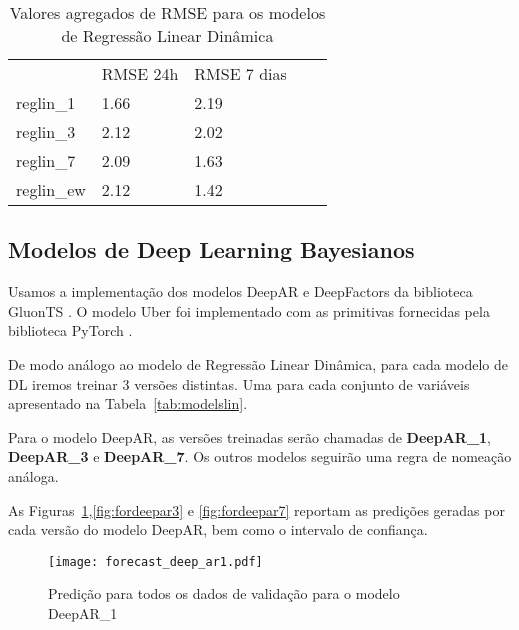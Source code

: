 \begin{center}
  \begin{table}[]
    \centering
    \begin{tabular}{l|llll}
      \cline{2-3}
      & \multicolumn{1}{l|}{RMSE 24h} & \multicolumn{1}{l|}{RMSE 7 dias} &  \\ \cline{1-3}
      \multicolumn{1}{|l|}{reglin\_1} & 1.66                          & 2.19                             &  \\ \cline{1-1}
      \multicolumn{1}{|l|}{reglin\_3} & 2.12                          & 2.02                             &  \\ \cline{1-1}
      \multicolumn{1}{|l|}{reglin\_7} & 2.09                          & 1.63                             &  \\ \cline{1-1}
      \multicolumn{1}{|l|}{reglin\_ew} & 2.12                          & 1.42                            &  \\ \cline{1-1}
    \end{tabular}
    \caption{Valores agregados de RMSE para os modelos de Regressão Linear Dinâmica}

    \label{tb:rmse_exp}
  \end{table}
\end{center}



\subsection{Modelos de Deep Learning Bayesianos}


Usamos a implementação dos modelos DeepAR e DeepFactors da biblioteca GluonTS
\citep{gluonts}. O modelo Uber foi implementado com as primitivas fornecidas
pela biblioteca PyTorch \citep{pytorch}.

De modo análogo ao modelo de Regressão Linear Dinâmica, para
cada modelo de DL iremos treinar 3 versões distintas. Uma para cada conjunto de variáveis apresentado na Tabela~\ref{tab:modelslin}.


Para o modelo DeepAR, as versões treinadas serão chamadas de \textbf{DeepAR\_1},
\textbf{DeepAR\_3} e \textbf{DeepAR\_7}. Os outros modelos seguirão uma
regra de nomeação análoga.

As Figuras~\ref{fig:fordeepar1},\ref{fig:fordeepar3} e \ref{fig:fordeepar7} reportam as
predições geradas por cada versão do modelo DeepAR, bem como o intervalo de confiança. 

\begin{figure}[H]
  \centering
  \texttt{[image: forecast\_deep\_ar1.pdf]} 
  \caption{Predição para todos os dados de validação para o modelo DeepAR\_1}
  \label{fig:fordeepar1}
\end{figure}

